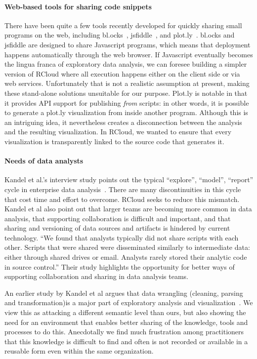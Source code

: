 \paragraph*{Web-based tools for sharing code snippets}
There have been quite a few tools recently developed for quickly
sharing small programs on the web, including
bl.ocks~\cite{blocks}, jsfiddle~\cite{jsfiddle}, and
plot.ly~\cite{plotly}. bl.ocks and jsfiddle are designed to
share Javascript programs, which means that deployment happens
automatically through the web browser. If Javascript eventually becomes
the lingua franca of exploratory data analysis, we can foresee
building a simpler version of RCloud where all execution happens
either on the client side or via web services. Unfortunately that is
not a realistic assumption at present, making these stand-alone
solutions unsuitable for our purpose. Plot.ly is notable in that it
provides API support for publishing \emph{from} scripts: in other
words, it is possible to generate a plot.ly visualization from inside
another program. Although this is an intriguing idea, it
nevertheless creates a disconnection between the analysis and the
resulting visualization. In RCloud, we wanted to ensure that every
visualization is transparently linked to the source code that
generates it.

\paragraph*{Needs of data analysts}
Kandel et al.'s interview study points out the typical ``explore'',
``model'', ``report'' cycle in enterprise data
analysis~\cite{Kandel:2012:EDA}. There are many discontinuities in
this cycle that cost time and effort to overcome. RCloud seeks to
reduce this mismatch. Kandel et al also point out that larger teams
are becoming more common in data analysis, that supporting
collaboration is difficult and important, and that sharing
and versioning of data sources and artifacts is hindered by current
technology. ``We found that analysts typically did not
share scripts with each other. Scripts that were shared were
disseminated similarly to intermediate data: either through shared
drives or email. Analysts rarely stored their analytic code in source
control.'' Their study highlights the opportunity for better ways
of supporting collaboration and sharing in data analysis teams.

An earlier study by Kandel et al argues that data wrangling
(cleaning, parsing and transformation)is a major part of exploratory
analysis and visualization~\cite{Kandel:2011:RDI}. We view this
as attacking a different semantic level than ours, but also
showing the need for an environment that enables better sharing
of the knowledge, tools and processes to do this. Anecdotally
we find much frustration among practitioners that this knowledge
is difficult to find and often is not recorded or available in a
reusable form even within the same organization.


